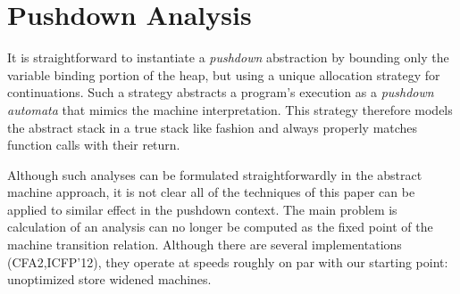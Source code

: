 \documentclass{llncs}
\begin{document}
\section{Pushdown Analysis}

It is straightforward to instantiate a \emph{pushdown} abstraction by
bounding only the variable binding portion of the heap, but using a
unique allocation strategy for continuations.  Such a strategy
abstracts a program's execution as a \emph{pushdown automata}
that mimics the machine interpretation.  This strategy therefore
models the abstract stack in a true stack like fashion and always
properly matches function calls with their return.

Although such analyses can be formulated straightforwardly in the
abstract machine approach, it is not clear all of the techniques of
this paper can be applied to similar effect in the pushdown context.
The main problem is calculation of an analysis can no longer be
computed as the fixed point of the machine transition relation.
Although there are several implementations (CFA2,ICFP'12), they
operate at speeds roughly on par with our starting point: unoptimized
store widened machines.
\end{document}
